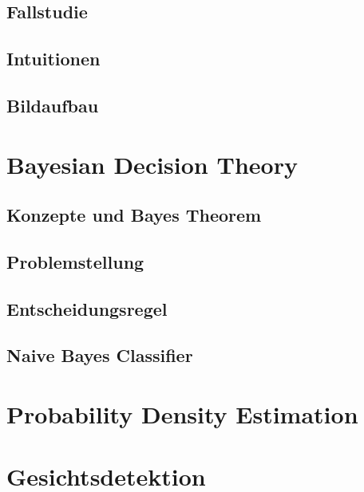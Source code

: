 \documentclass[a4paper, 11pt, accentcolor = tud3b]{tudreport}
\begin{document}
			\subsection{Fallstudie} %

			\subsection{Intuitionen} %

			\subsection{Bildaufbau} %

		\section{Bayesian Decision Theory} %

			\subsection{Konzepte und Bayes Theorem} %

			\subsection{Problemstellung} %

			\subsection{Entscheidungsregel} %

			\subsection{Naive Bayes Classifier} %

		\section{Probability Density Estimation} %

		\section{Gesichtsdetektion} %
\end{document}
